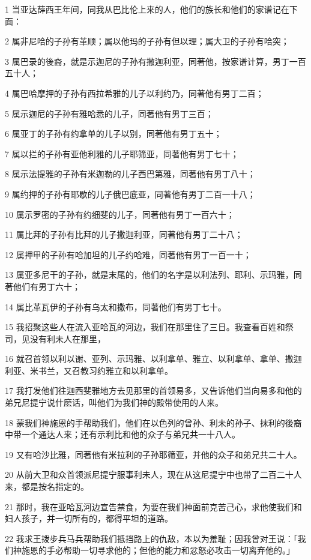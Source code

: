\par 1 当亚达薛西王年间，同我从巴比伦上来的人，他们的族长和他们的家谱记在下面：
\par 2 属非尼哈的子孙有革顺；属以他玛的子孙有但以理；属大卫的子孙有哈突；
\par 3 属巴录的後裔，就是示迦尼的子孙有撒迦利亚，同著他，按家谱计算，男丁一百五十人；
\par 4 属巴哈摩押的子孙有西拉希雅的儿子以利约乃，同著他有男丁二百；
\par 5 属示迦尼的子孙有雅哈悉的儿子，同著他有男丁三百；
\par 6 属亚丁的子孙有约拿单的儿子以别，同著他有男丁五十；
\par 7 属以拦的子孙有亚他利雅的儿子耶筛亚，同著他有男丁七十；
\par 8 属示法提雅的子孙有米迦勒的儿子西巴第雅，同著他有男丁八十；
\par 9 属约押的子孙有耶歇的儿子俄巴底亚，同著他有男丁二百一十八；
\par 10 属示罗密的子孙有约细斐的儿子，同著他有男丁一百六十；
\par 11 属比拜的子孙有比拜的儿子撒迦利亚，同著他有男丁二十八；
\par 12 属押甲的子孙有哈加坦的儿子约哈难，同著他有男丁一百一十；
\par 13 属亚多尼干的子孙，就是末尾的，他们的名字是以利法列、耶利、示玛雅，同著他们有男丁六十；
\par 14 属比革瓦伊的子孙有乌太和撒布，同著他们有男丁七十。
\par 15 我招聚这些人在流入亚哈瓦的河边，我们在那里住了三日。我查看百姓和祭司，见没有利未人在那里，
\par 16 就召首领以利以谢、亚列、示玛雅、以利拿单、雅立、以利拿单、拿单、撒迦利亚、米书兰，又召教习约雅立和以利拿单。
\par 17 我打发他们往迦西斐雅地方去见那里的首领易多，又告诉他们当向易多和他的弟兄尼提宁说什麽话，叫他们为我们神的殿带使用的人来。
\par 18 蒙我们神施恩的手帮助我们，他们在以色列的曾孙、利未的孙子、抹利的後裔中带一个通达人来；还有示利比和他的众子与弟兄共一十八人。
\par 19 又有哈沙比雅，同著他有米拉利的子孙耶筛亚，并他的众子和弟兄共二十人。
\par 20 从前大卫和众首领派尼提宁服事利未人，现在从这尼提宁中也带了二百二十人来，都是按名指定的。
\par 21 那时，我在亚哈瓦河边宣告禁食，为要在我们神面前克苦己心，求他使我们和妇人孩子，并一切所有的，都得平坦的道路。
\par 22 我求王拨步兵马兵帮助我们抵挡路上的仇敌，本以为羞耻；因我曾对王说：「我们神施恩的手必帮助一切寻求他的；但他的能力和忿怒必攻击一切离弃他的。」
